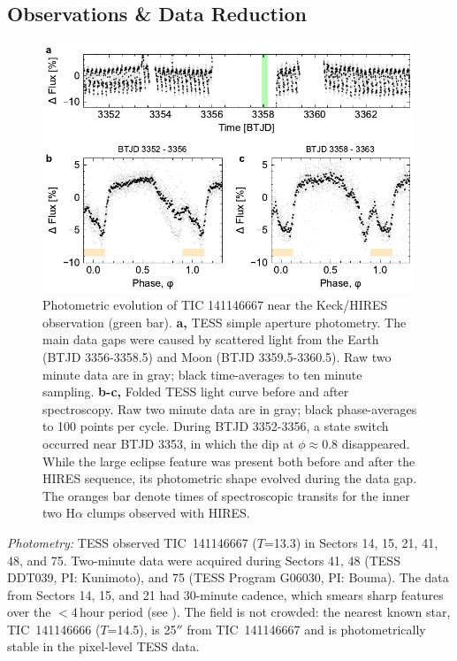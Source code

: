 \documentclass{nature3}
\begin{document}
\newpage
\begin{methods}

\renewcommand{\figurename}{Extended Data Figure}
\renewcommand{\tablename}{Extended Data Table}
\setcounter{table}{0}  
\setcounter{figure}{0}  

\subsection{Observations \& Data Reduction}\phantom{+}

\begin{figure}[!b]
  \centering
  \includegraphics[width=0.99\textwidth]{figures/sf1.pdf}
  \caption{Photometric evolution of TIC 141146667 near the Keck/HIRES
  observation (green bar).  {\bf a,} TESS simple aperture photometry.
  The main data gaps were caused by scattered light from the Earth
  (BTJD 3356-3358.5) and Moon (BTJD 3359.5-3360.5).  Raw two minute
  data are in gray; black time-averages to ten minute sampling.  {\bf
  b-c,} Folded TESS light curve before and after spectroscopy.  Raw
  two minute data are in gray; black phase-averages to 100 points per
  cycle.  During BTJD 3352-3356, a state switch occurred near BTJD
  3353, in which the dip at $\phi$$\approx$0.8 disappeared.  While the
  large eclipse feature was present both before and after the HIRES
  sequence, its photometric shape evolved during the data gap.  The
  oranges bar denote times of spectroscopic transits for the inner two
  H$\alpha$ clumps observed with HIRES.}
  \label{fig:fulllc}
\end{figure}

{\it Photometry:} TESS observed TIC~141146667 ($T$=13.3) in Sectors 14,
15, 21, 41, 48, and 75.  Two-minute data were acquired during Sectors
41, 48 (TESS DDT039, PI: Kunimoto), and 75 (TESS Program G06030, PI:
Bouma).  The data from Sectors 14, 15, and 21 had 30-minute cadence,
which smears sharp features over the $<$4\,hour period (see
\cite{Gunther2022}).  The field is not crowded:  the nearest known
star, TIC~141146666 ($T$=14.5), is 25$''$ from TIC~141146667 and is
photometrically stable in the pixel-level TESS data.


\end{methods}
\end{document}
